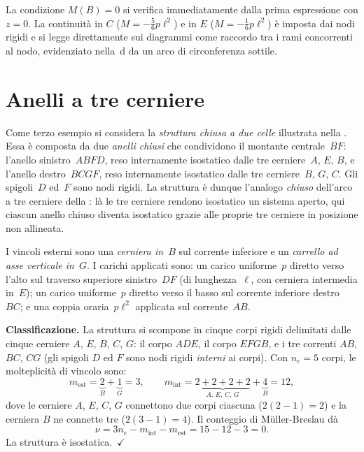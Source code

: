\begin{oss}
La condizione $M(B) = 0$ si verifica
immediatamente dalla prima espressione con $z=0$.
La continuità in $C$ ($M = -\tfrac{5}{6}p\ell^2$)
e in $E$ ($M = -\tfrac{1}{6}p\ell^2$) è imposta
dai nodi rigidi e si legge direttamente sui diagrammi
come raccordo tra i rami concorrenti al nodo,
evidenziato nella \,d
da un arco di circonferenza sottile.
\end{oss}


\section{Anelli a tre cerniere}
\label{sec:anello_tre_cerniere}

Come terzo esempio si considera la \emph{struttura chiusa
	a due celle} illustrata nella .
Essa è composta da due \emph{anelli chiusi} che condividono
il montante centrale~$BF$: l'anello sinistro~$ABFD$, reso
internamente isostatico dalle tre cerniere~$A$, $E$, $B$,
e l'anello destro~$BCGF$, reso internamente isostatico
dalle tre cerniere~$B$, $G$, $C$. Gli spigoli~$D$ ed~$F$
sono nodi rigidi. La struttura è dunque l'analogo
\emph{chiuso} dell'arco a tre cerniere della
: là le tre cerniere rendono
isostatico un sistema aperto, qui ciascun anello chiuso
diventa isostatico grazie alle proprie tre cerniere in
posizione non allineata.

I vincoli esterni sono una \emph{cerniera in~$B$} sul
corrente inferiore e un \emph{carrello ad asse verticale
	in~$G$}. I carichi applicati sono: un carico uniforme~$p$
diretto verso l'alto sul traverso superiore sinistro~$DF$
(di lunghezza~$\ell$, con cerniera intermedia in~$E$);
un carico uniforme~$p$ diretto verso il basso sul corrente
inferiore destro~$BC$; e una coppia oraria~$p\ell^2$
applicata sul corrente~$AB$.






\noindent\textbf{Classificazione.}
La struttura si scompone in cinque corpi rigidi delimitati
dalle cinque cerniere $A$, $E$, $B$, $C$, $G$: il corpo
$ADE$, il corpo $EFGB$, e i tre correnti $AB$, $BC$, $CG$
(gli spigoli $D$ ed $F$ sono nodi rigidi \emph{interni}
ai corpi). Con $n_e = 5$ corpi, le molteplicità di vincolo
sono:
\[
m_{\mathrm{est}} = \underbrace{2}_{B} + \underbrace{1}_{G} = 3,
\qquad
m_{\mathrm{int}} = \underbrace{2+2+2+2}_{A,\,E,\,C,\,G}
+ \underbrace{4}_{B} = 12,
\]
dove le cerniere $A$, $E$, $C$, $G$ connettono due corpi
ciascuna ($2(2-1)=2$) e la cerniera $B$ ne connette tre
($2(3-1)=4$). Il conteggio di Müller-Breslau dà
\[
\nu = 3n_e - m_{\mathrm{int}} - m_{\mathrm{est}}
= 15 - 12 - 3 = 0.
\]
La struttura è isostatica.~$\checkmark$

